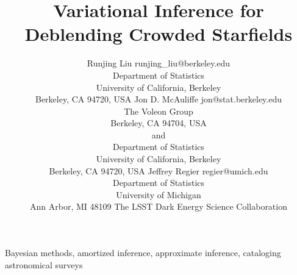 \documentclass[twoside,11pt]{article}
\begin{document}
\title{Variational Inference for Deblending Crowded Starfields}

\author{\name Runjing Liu
    \email runjing\_liu@berkeley.edu \\
    \addr Department of Statistics\\
    University of California, Berkeley\\
    Berkeley, CA 94720, USA
    \AND
    \name Jon D. McAuliffe
    \email jon@stat.berkeley.edu \\
    \addr
    The Voleon Group \\
    Berkeley, CA 94704, USA \\
    and\\
    Department of Statistics\\
    University of California, Berkeley\\
    Berkeley, CA 94720, USA
    \AND
    \name Jeffrey Regier
    \email regier@umich.edu \\
    \addr
    Department of Statistics \\
    University of Michigan \\
    Ann Arbor, MI 48109
    \AND
    \name The LSST Dark Energy Science Collaboration
    }

\editor{}

\maketitle

\begin{abstract}%

\end{abstract}

\begin{keywords}
  Bayesian methods, amortized inference, approximate inference, cataloging astronomical surveys
\end{keywords}












\acks{}

\end{document}
